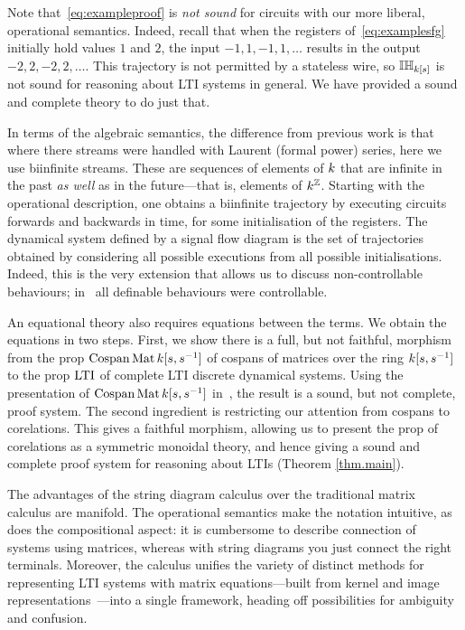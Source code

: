 Note that~\eqref{eq:exampleproof} is \emph{not sound} for circuits
with our more liberal, operational semantics. Indeed, recall that when the
registers of~\eqref{eq:examplesfg} initially hold values $1$ and $2$, the input
$-1,1,-1,1,\dots$ results in the output $-2,2,-2,2,\dots$. This trajectory is
not permitted by a stateless wire, so $\mathbb{IH}_{k[s]}$ is not sound for reasoning
about LTI systems in general. We have provided a sound
and complete theory to do just that.

In terms of the algebraic semantics, the difference from previous
work is that where there streams were handled with Laurent
(formal power) series, here we use biinfinite streams. These are sequences of
elements of $k$ that are infinite in the past \emph{as well} as in the
future---that is, elements of $k^{\mathbb Z}$.  Starting with the operational
description, one obtains a biinfinite trajectory by executing circuits forwards
and backwards in time, for some initialisation of the registers. The dynamical
system defined by a signal flow diagram is the set of trajectories obtained by
considering all possible executions from all possible initialisations.  Indeed,
this is the very extension that allows us to discuss non-controllable
behaviours; in~\cite{BSZ,BSZ3,Za,BE} all definable behaviours were controllable. 

An equational theory also requires equations between the terms. We obtain the
equations in two steps. First, we show there is a full, but not faithful,
morphism from the prop $\operatorname{{Cospan}}\operatorname{\mathrm{Mat}}{k[s,s^{-1}]}$ of cospans of matrices over the ring
${k[s,s^{-1}]}$ to the prop $\operatorname{\mathrm{LTI}}$ of complete LTI discrete dynamical systems.
Using the presentation of $\operatorname{{Cospan}}\operatorname{\mathrm{Mat}}{k[s,s^{-1}]}$ in~\cite{BSZ2,Za}, the result is a
sound, but not complete, proof system. The second ingredient is restricting our
attention from cospans to corelations. This gives a faithful morphism, allowing
us to present the prop of corelations as a symmetric monoidal theory, and hence
giving a sound and complete proof system for reasoning about LTIs (Theorem
\ref{thm.main}).

The advantages of the string diagram calculus over the traditional matrix
calculus are manifold. The operational semantics make the notation intuitive, as
does the compositional aspect: it is cumbersome to describe connection of
systems using matrices, whereas with string diagrams you just connect the right
terminals. Moreover, the calculus unifies the variety of distinct methods for
representing LTI systems with matrix equations---built from kernel and image
representations~\cite{Wi,Wi3}---into a single framework, heading off
possibilities for ambiguity and confusion.

